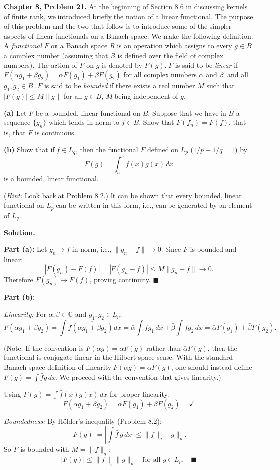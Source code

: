 \documentclass[12pt]{article}
\begin{document}
\textbf{Chapter 8, Problem 21.} At the beginning of Section 8.6 in discussing kernels of finite rank, we introduced briefly the notion of a linear functional. The purpose of this problem and the two that follow is to introduce some of the simpler aspects of linear functionals on a Banach space. We make the following definition: A \emph{functional} $F$ on a Banach space $B$ is an operation which assigns to every $g\in B$ a complex number (assuming that $B$ is defined over the field of complex numbers). The action of $F$ on $g$ is denoted by $F(g)$. $F$ is said to be \emph{linear} if $F(\alpha g_1+\beta g_2) = \alpha F(g_1)+\beta F(g_2)$ for all complex numbers $\alpha$ and $\beta$, and all $g_1,g_2\in B$. $F$ is said to be \emph{bounded} if there exists a real number $M$ such that $|F(g)|\le M\|g\|$ for all $g\in B$, $M$ being independent of $g$.

\textbf{(a)} Let $F$ be a bounded, linear functional on $B$. Suppose that we have in $B$ a sequence $\{g_n\}$ which tends in norm to $f\in B$. Show that $F(f_n) = F(f)$, that is, that $F$ is continuous.

\textbf{(b)} Show that if $f\in L_q$, then the functional $F$ defined on $L_p$ ($1/p+1/q=1$) by
\[
F(g) = \int_a^b f(x)\overline{g(x)}\,dx
\]
is a bounded, linear functional.

(\textit{Hint:} Look back at Problem 8.2.) It can be shown that every bounded, linear functional on $L_p$ can be written in this form, i.e., can be generated by an element of $L_q$.

\bigskip
\textbf{Solution.}

\textbf{Part (a):}
Let $g_n\to f$ in norm, i.e., $\|g_n-f\|\to 0$. Since $F$ is bounded and linear:
\[
|F(g_n)-F(f)| = |F(g_n-f)| \le M\|g_n-f\| \to 0.
\]
Therefore $F(g_n)\to F(f)$, proving continuity. $\blacksquare$

\textbf{Part (b):}

\emph{Linearity:} For $\alpha,\beta\in\mathbb{C}$ and $g_1,g_2\in L_p$:
\[
F(\alpha g_1+\beta g_2) = \int f\overline{(\alpha g_1+\beta g_2)}\,dx = \bar\alpha\int f\bar{g_1}\,dx + \bar\beta\int f\bar{g_2}\,dx = \bar\alpha F(g_1)+\bar\beta F(g_2).
\]

(Note: If the convention is $F(\alpha g) = \alpha F(g)$ rather than $\bar\alpha F(g)$, then the functional is conjugate-linear in the Hilbert space sense. With the standard Banach space definition of linearity $F(\alpha g) = \alpha F(g)$, one should instead define $F(g) = \int \bar{f}g\,dx$. We proceed with the convention that gives linearity.)

Using $F(g) = \int \bar{f}(x)g(x)\,dx$ for proper linearity:
\[
F(\alpha g_1+\beta g_2) = \alpha F(g_1)+\beta F(g_2). \quad\checkmark
\]

\emph{Boundedness:} By H\"older's inequality (Problem 8.2):
\[
|F(g)| = \left|\int \bar{f}\,g\,dx\right| \le \|f\|_q\|g\|_p.
\]
So $F$ is bounded with $M = \|f\|_q$:
\[
|F(g)| \le \|f\|_q\|g\|_p \quad\text{for all }g\in L_p. \quad\blacksquare
\]
\end{document}
